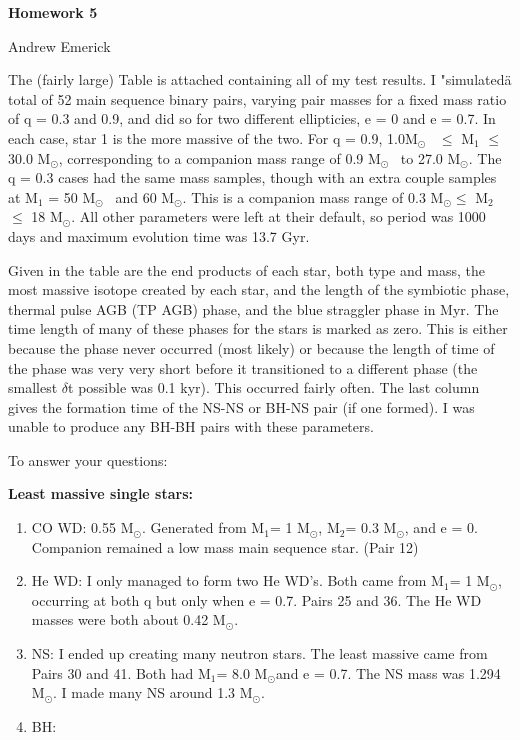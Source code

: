 \documentclass[12pt]{article}%
\newcommand{\msun}{M$_{\odot}$}
\newcommand{\mone}{M$_1$}
\newcommand{\mtwo}{M$_2$}
\begin{document}
\begin{center}
\large{\textbf{Homework 5}}

\large{Andrew Emerick}
\end{center}

The (fairly large) Table is attached containing all of my test results. I "simulated\" a total of 52 main sequence binary pairs, varying pair masses for a fixed mass ratio of q = 0.3 and 0.9, and did so for two different ellipticies, e = 0 and e = 0.7. In each case, star 1 is the more massive of the two. For q = 0.9, 1.0\msun~ $\le$ M$_1$ $\le$ 30.0 \msun, corresponding to a companion mass range of 0.9 \msun~ to 27.0 \msun. The q = 0.3 cases had the same mass samples, though with an extra couple samples at M$_1$ = 50 \msun~ and 60 \msun. This is a companion mass range of 0.3 \msun $\le$ M$_2$ $\le$ 18 \msun. All other parameters were left at their default, so period was 1000 days and maximum evolution time was 13.7 Gyr.

\vspace{.1cm}

Given in the table are the end products of each star, both type and mass, the most massive isotope created by each star, and the length of the symbiotic phase, thermal pulse AGB (TP AGB) phase, and the blue straggler phase in Myr. The time length of many of these phases for the stars is marked as zero. This is either because the phase never occurred (most likely) or because the length of time of the phase was very very short before it transitioned to a different phase (the smallest $\delta$t possible was 0.1 kyr). This occurred fairly often. The last column gives the formation time of the NS-NS or BH-NS pair (if one formed). I was unable to produce any BH-BH pairs with these parameters.

\vspace{.1cm}

To answer your questions:

\vspace{.1cm}

\textbf{Least massive single stars:}
\begin{enumerate}
\item CO WD: 0.55 \msun. Generated from \mone = 1 \msun, \mtwo = 0.3 \msun, and e = 0. Companion remained a low mass main sequence star. (Pair 12)
\item He WD: I only managed to form two He WD's. Both came from \mone = 1 \msun, occurring at both q but only when e = 0.7. Pairs 25 and 36. The He WD masses were both about 0.42 \msun.
\item NS: I ended up creating many neutron stars. The least massive came from Pairs 30 and 41. Both had \mone = 8.0 \msun and e = 0.7. The NS mass was 1.294 \msun. I made many NS around 1.3 \msun.
\item BH: 
\end{enumerate}
\end{document}
